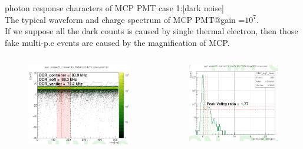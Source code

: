 \documentclass[11pt,compress,xcolor=x11names,UTF8]{beamer}
\begin{document}
\begin{frame}{photon response characters of MCP PMT }
	case 1:[dark noise]\\ The typical waveform and charge spectrum of MCP PMT@gain =$10^7$. \\
	If we suppose all the dark counts is caused by single thermal electron, then those fake multi-p.e events are caused by the magnification of MCP. 
\begin{columns}
\begin{column}{.485\textwidth}
\begin{figure}
\centering
\includegraphics[width=\textwidth]{figure/noise0pe.png} %
\end{figure}
\end{column}
\begin{column}{.5\textwidth}
\begin{figure}
\centering
\includegraphics[width=\textwidth]{figure/qdc0pe.png} %

\end{figure}
\end{column}
\end{columns}
\end{frame}
\end{document}
